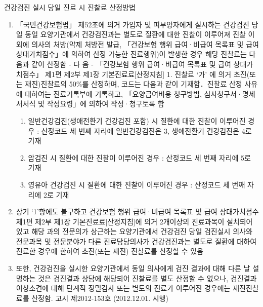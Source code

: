 \begin{commentbox}{건강검진 실시 당일 진료 시 진찰료 산정방법}
\begin{enumerate}[1.]\tightlist
\item 「국민건강보험법」 제52조에 의거 가입자 및 피부양자에게 실시하는 건강검진 당일 동일 요양기관에서 건강검진과는 별도로 질환에 대한 진찰이 이루어져 진찰 이외에 의사의 처방(약제 처방전 발급, 「건강보험 행위 급여·비급여 목록표 및 급여 상대가치점수」에 의하여 산정 가능한 진료행위)이 발생한 경우 해당 진찰료는 다음과 같이 산정함\newline
- 다 음 - \newline
「건강보험 행위 급여·비급여 목록표 및 급여 상대가치점수」 제1편 제2부 제1장 기본진료료[산정지침] 1. 진찰료 ‘가’ 에 의거 초진(또는 재진)진찰료의 50\%를 산정하며, 코드는 다음과 같이 기재함．진찰료 산정 사유에 대하여는 진료기록부에 기록하고, 「요양급여비용 청구방법, 심사청구서·명세서서식 및 작성요령」에 의하여 작성·청구토록 함
	\begin{enumerate}[(가)]\tightlist
	\item 일반건강검진(생애전환기 건강검진 포함) 시 질환에 대한 진찰이 이루어진 경우 : 산정코드 세 번째 자리에 일반건강검진은 3, 생애전환기 건강검진은 4로 기재
	\item 암검진 시 질환에 대한 진찰이 이루어진 경우 : 산정코드 세 번째 자리에 5로 기재
	\item 영유아 건강검진 시 질환에 대한 진찰이 이루어진 경우 : 산정코드 세 번째 자리에 2로 기재
	\end{enumerate}
\item 상기 ‘1’항에도 불구하고 건강보험 행위 급여·비급여 목록표 및 급여 상대가치점수 제1편 제2부 제1장 기본진료료[산정지침]에 의거 2개이상의 진료과목이 설치되어 있고 해당 과의 전문의가 상근하는 요양기관에서 건강검진 당일 검진실시 의사와 전문과목 및 전문분야가 다른 진료담당의사가 건강검진과는 별도로 질환에 대하여 진료한 경우에 한하여 초진(또는 재진) 진찰료를 산정할 수 있음
\item 또한, 건강검진을 실시한 요양기관에서 동일 의사에게 검진 결과에 대해 다른 날 설명하는 것은 검진결과 상담에 해당되어 진찰료를 별도 산정할 수 없으나, 검진결과 이상소견에 대해 단계적 정밀검사 또는 별도의 진료가 이루어진 경우에는 재진진찰료를 산정함. 고시 제2012-153호 (2012.12.01. 시행)
\end{enumerate}
\end{commentbox}


